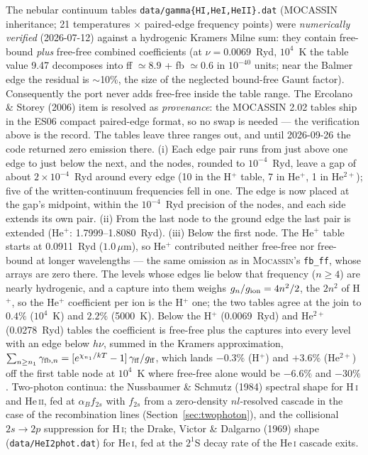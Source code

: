 \documentclass[english,a4paper]{my_memo}
\newcommand{\code}[1]{\texttt{#1}}
\begin{document}
The nebular continuum tables \code{data/gamma\{HI,HeI,HeII\}.dat}
(MOCASSIN inheritance; 21 temperatures $\times$ paired-edge frequency
points) were \emph{numerically verified} (2026-07-12) against a
hydrogenic Kramers Milne sum: they contain free-bound \emph{plus}
free-free combined coefficients (at $\nu = 0.0069$~Ryd, $10^4$~K the
table value 9.47 decomposes into ff $\simeq 8.9$ + fb $\simeq 0.6$ in
$10^{-40}$ units; near the Balmer edge the residual is $\sim$10\%, the
size of the neglected bound-free Gaunt factor).  Consequently the port
never adds free-free inside the table range.  The Ercolano \& Storey
(2006) item is resolved as \emph{provenance}: the MOCASSIN 2.02 tables
ship in the ES06 compact paired-edge format, so no swap is needed ---
the verification above is the record.  The tables leave three ranges
out, and until 2026-09-26 the code returned zero emission there.  (i) Each
edge pair runs from just above one edge to just below the next, and the
nodes, rounded to $10^{-4}$~Ryd, leave a gap of about $2{\times}10^{-4}$~Ryd
around every edge (10 in the H$^+$ table, 7 in He$^+$, 1 in He$^{2+}$); five
of the written-continuum frequencies fell in one.  The edge is now placed at
the gap's midpoint, within the $10^{-4}$~Ryd precision of the nodes, and
each side extends its own pair.  (ii) From the last node to the ground edge
the last pair is extended (He$^+$: 1.7999--1.8080~Ryd).  (iii) Below the
first node.  The He$^+$ table starts at 0.0911~Ryd ($1.0\,\mu$m), so He$^+$
contributed neither free-free nor free-bound at longer wavelengths --- the
same omission as in \textsc{Mocassin}'s \code{fb\_ff}, whose arrays are zero
there.  The levels whose edges lie below that frequency ($n\ge4$) are nearly
hydrogenic, and a capture into them weighs $g_n/g_{\rm ion} = 4n^2/2$, the
$2n^2$ of H$^+$, so the He$^+$ coefficient per ion is the H$^+$ one; the two
tables agree at the join to $0.4\%$ ($10^4$~K) and $2.2\%$ (5000~K).  Below
the H$^+$ (0.0069~Ryd) and He$^{2+}$ (0.0278~Ryd) tables the coefficient is
free-free plus the captures into every level with an edge below $h\nu$,
summed in the Kramers approximation,
$\sum_{n\ge n_1}\gamma_{{\rm fb},n} = [e^{\chi_{n_1}/kT}-1]\,\gamma_{\rm ff}/g_{\rm ff}$,
which lands $-0.3\%$ (H$^+$) and $+3.6\%$ (He$^{2+}$) off the first table
node at $10^4$~K where free-free alone would be $-6.6\%$ and $-30\%$.  Two-photon continua: the
Nussbaumer \& Schmutz (1984) spectral shape for H\,\textsc{i} and
He\,\textsc{ii}, fed at $\alpha_B f_{2s}$ with $f_{2s}$ from a
zero-density $nl$-resolved cascade in the case of the recombination lines
(Section~\ref{sec:twophoton}), and the collisional $2s\to2p$ suppression
for H\,\textsc{i}; the Drake, Victor \& Dalgarno (1969) shape
(\code{data/HeI2phot.dat}) for He\,\textsc{i}, fed at the $2^1$S decay
rate of the He\,\textsc{i} cascade exits.
\end{document}
